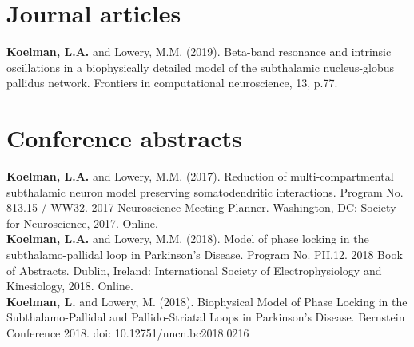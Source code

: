 
\section*{Journal articles}
%

\textbf{Koelman, L.A.} and Lowery, M.M. (2019). Beta-band resonance and intrinsic oscillations in a biophysically detailed model of the subthalamic nucleus-globus pallidus network. Frontiers in computational neuroscience, 13, p.77.

\section*{Conference abstracts}
%
%
%

%
%

\textbf{Koelman, L.A.} and Lowery, M.M. (2017). Reduction of multi-compartmental subthalamic neuron model preserving somatodendritic interactions. Program No. 813.15 / WW32. 2017 Neuroscience Meeting Planner. Washington, DC: Society for Neuroscience, 2017. Online.\\

%

%

%

%
%
%

%
%

\noindent
\textbf{Koelman, L.A.} and Lowery, M.M. (2018). Model of phase locking in the subthalamo-pallidal loop in Parkinson's Disease. Program No. PII.12. 2018 Book of Abstracts. Dublin, Ireland: International Society of Electrophysiology and Kinesiology, 2018. Online.\\

%

%

%

%

%

%

%

%

%
%
%
%

\noindent
\textbf{Koelman, L.} and Lowery, M. (2018). Biophysical Model of Phase Locking in the Subthalamo-Pallidal and Pallido-Striatal Loops in Parkinson's Disease. Bernstein Conference 2018. doi: 10.12751/nncn.bc2018.0216 

%
%
%
%
%
%

%
%
%
%
%
%
%

%
%
%
%
%
%
%
%

%
%
%

%

